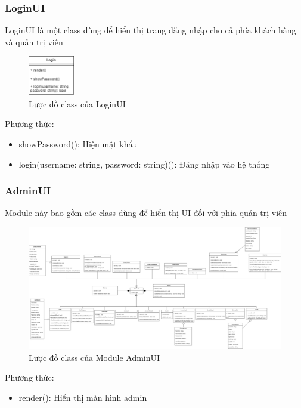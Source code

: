 \subsubsection{LoginUI}
LoginUI là một class dùng để hiển thị trang đăng nhập cho cả phía khách hàng và quản trị viên
\begin{figure}[!htp]
	\centering
	\includegraphics[width=2cm]{img/Architecture/UI/loginUI.png}
	\newline
	\caption{Lược đồ class của LoginUI}
\end{figure}
Phương thức:
\begin{itemize}
	\item showPassword(): Hiện mật khẩu
	\item login(username: string, password: string)(): Đăng nhập vào hệ thống
\end{itemize}

\subsubsection{AdminUI}
Module này bao gồm các class dùng để hiển thị UI đối với phía quản trị viên

\begin{figure}[!htp]
	\centering
	\includegraphics[width=17cm]{img/Architecture/UI/adminUI.png}
	\newline
	\caption{Lược đồ class của Module AdminUI}
\end{figure}

Phương thức:
\begin{itemize}
	\item render(): Hiển thị màn hình admin
\end{itemize}

